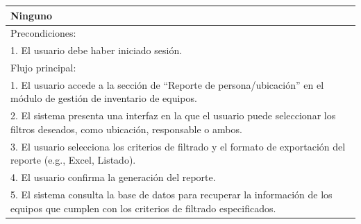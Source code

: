 \documentclass[stu, 12pt, letterpaper, donotrepeattitle, floatsintext, natbib]{apa7}
\begin{document}
\begin{longtable}{@{} p{16.5cm} @{}}
    Ninguno                                                                                                                                                                                                                                                                      \\ \midrule
    Precondiciones:                                                                                                                                                                                                                                                              \\
    1. El usuario debe haber iniciado sesi\'on.                                                                                                                                                                                                                                  \\ \midrule
    Flujo principal:                                                                                                                                                                                                                                                             \\
    1. El usuario accede a la secci\'on de ``Reporte de persona/ubicaci\'on'' en el m\'odulo de gesti\'on de inventario de equipos.                                                                                                                                              \\
    2. El sistema presenta una interfaz en la que el usuario puede seleccionar los filtros deseados, como ubicaci\'on, responsable o ambos.                                                                                                                                      \\
    3. El usuario selecciona los criterios de filtrado y el formato de exportaci\'on del reporte (e.g., Excel, Listado).                                                                                                                                                         \\
    4. El usuario confirma la generaci\'on del reporte.                                                                                                                                                                                                                          \\
    5. El sistema consulta la base de datos para recuperar la informaci\'on de los equipos que cumplen con los criterios de filtrado especificados.                                                                                                                              \\

\end{longtable}
\end{document}
